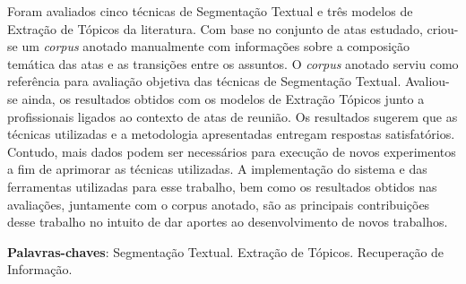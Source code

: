 \begin{resumo}
% 
% 
% 
% 
Foram avaliados cinco técnicas de Segmentação Textual e três modelos de Extração de Tópicos da literatura. Com base no conjunto de atas estudado, criou-se um \textit{corpus} anotado manualmente com informações sobre a composição temática das atas e as transições entre os assuntos. O \textit{corpus} anotado serviu como referência para avaliação objetiva das técnicas de Segmentação Textual. Avaliou-se ainda, os resultados obtidos com os modelos de Extração Tópicos junto a profissionais ligados ao contexto de atas de reunião.
% 
% 
% 
% 
Os resultados sugerem que as técnicas utilizadas e a metodologia apresentadas entregam respostas satisfatórios. Contudo, mais dados podem ser necessários para execução de novos experimentos a fim de aprimorar as técnicas utilizadas.
% 
% 
% 
% 
% 
A implementação do sistema e das ferramentas utilizadas para esse trabalho, bem como os resultados obtidos nas avaliações, juntamente com o corpus anotado, são as principais contribuições desse trabalho no intuito de dar aportes ao desenvolvimento de novos trabalhos.
% 
% 
% 
% 
% 


\textbf{Palavras-chaves}: 
Segmentação Textual. 
Extração de Tópicos.
Recuperação de Informação. 

\end{resumo}



